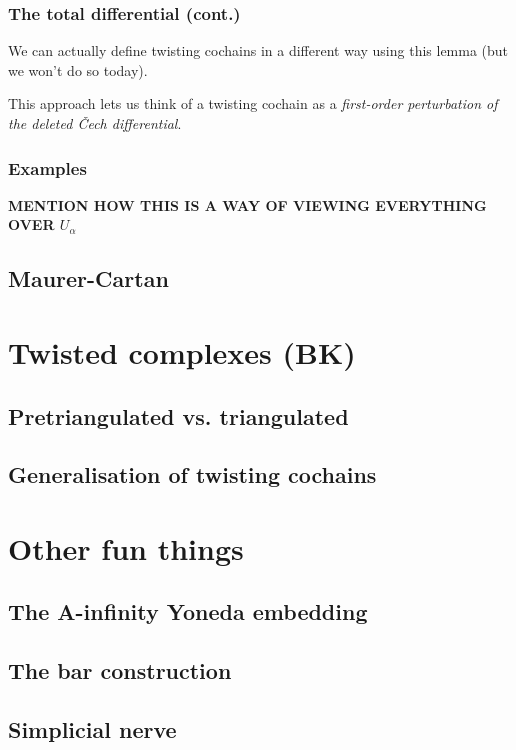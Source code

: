 \documentclass{beamer}
\begin{document}
            \begin{frame}\frametitle{The total differential (cont.)}
                We can actually define twisting cochains in a different way using this lemma (but we won't do so today).

                \pause

                This approach lets us think of a twisting cochain as a \emph{first-order perturbation of the deleted Čech differential}.
            \end{frame}

            \begin{frame}\frametitle{Examples}
                \textbf{MENTION HOW THIS IS A WAY OF VIEWING EVERYTHING OVER $U_\alpha$}
            \end{frame}

        \subsection{Maurer-Cartan}


    \section{Twisted complexes (BK)}
        
        \subsection{Pretriangulated vs. triangulated}
        
        \subsection{Generalisation of twisting cochains}
    

    \section{Other fun things}

        \subsection{The A-infinity Yoneda embedding}
        
        \subsection{The bar construction}
        
        \subsection{Simplicial nerve}
\end{document}
